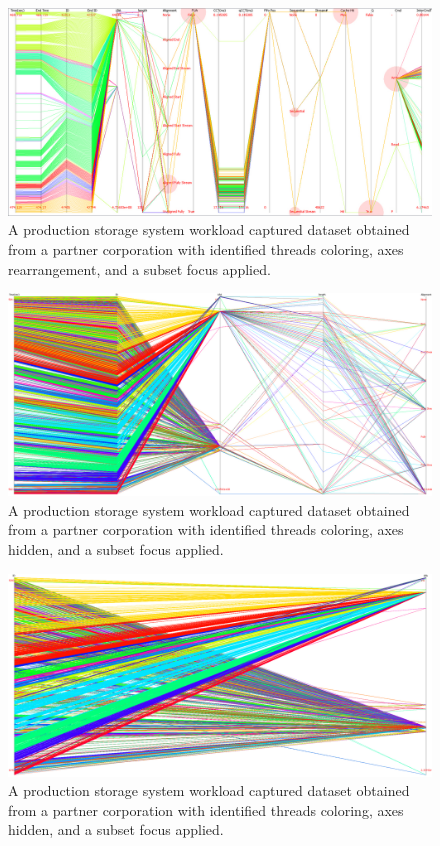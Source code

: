 \documentclass[12pt]{ucthesis}
\begin{document}
\begin{figure}[h!]
 \centering
 \includegraphics[width=\textwidth]{images/5.jpg}
 \caption[Focus applied on a production workload with threads colored.]{A production storage system workload captured dataset obtained from a partner corporation with identified threads coloring, axes rearrangement, and a subset focus applied.}
\end{figure}

\begin{figure}[h!]
 \centering
 \includegraphics[width=\textwidth]{images/6.jpg}
 \caption[Focus applied on a production workload with threads colored.]{A production storage system workload captured dataset obtained from a partner corporation with identified threads coloring, axes hidden, and a subset focus applied.}
\end{figure}

\begin{figure}[h!]
 \centering
 \includegraphics[width=\textwidth]{images/7.jpg}
 \caption[Focus applied on a production workload with threads colored.]{A production storage system workload captured dataset obtained from a partner corporation with identified threads coloring, axes hidden, and a subset focus applied.}
\end{figure}
\end{document}
